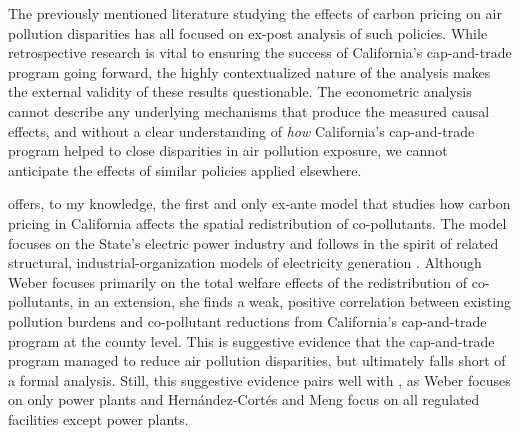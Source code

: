
The previously mentioned literature studying the effects of carbon pricing on air pollution disparities has all focused on ex-post analysis of such policies. While retrospective research is vital to ensuring the success of California's cap-and-trade program going forward, the highly contextualized nature of the analysis makes the external validity of these results questionable. The econometric analysis cannot describe any underlying mechanisms that produce the measured causal effects, and without a clear understanding of \emph{how} California's cap-and-trade program helped to close disparities in air pollution exposure, we cannot anticipate the effects of similar policies applied elsewhere. 

\cite{weber2021dynamic} offers, to my knowledge, the first and only ex-ante model that studies how carbon pricing in California affects the spatial redistribution of co-pollutants. The model focuses on the State's electric power industry and follows in the spirit of related structural, industrial-organization models of electricity generation \citep[e.g.,~][]{gowrisankaran2022policy, abito2022role}. Although Weber focuses primarily on the total welfare effects of the redistribution of co-pollutants, in an extension, she finds a weak, positive correlation between existing pollution burdens and co-pollutant reductions from California's cap-and-trade program at the county level. This is suggestive evidence that the cap-and-trade program managed to reduce air pollution disparities, but ultimately falls short of a formal analysis. Still, this suggestive evidence pairs well with \cite{hernandez2023environmental}, as Weber focuses on only power plants and Hernández-Cortés and Meng focus on all regulated facilities except power plants. 


